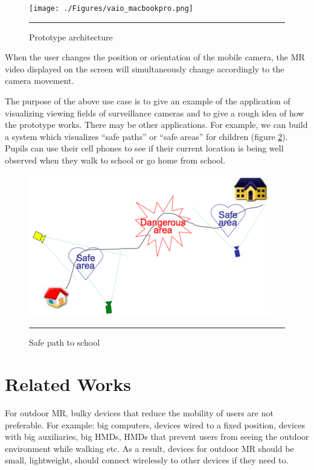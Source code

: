 \begin{figure}[htbp]
	\centering
	\texttt{[image: ./Figures/vaio\_macbookpro.png]}
	\rule{35em}{0.5pt}
	\caption[Prototype architecture]{Prototype architecture}
	\label{fig:VAIOMacBookPro}
\end{figure}

When the user changes the position or orientation of the mobile camera, the MR video displayed on the screen will simultaneously change accordingly to the camera movement.

The purpose of the above use case is to give an example of the application of visualizing viewing fields of surveillance cameras and to give a rough idea of how the prototype works. There may be other applications. For example, we can build a system which visualizes ``safe paths'' or ``safe areas'' for children (figure \ref{fig:HomeSchool}). Pupils can use their cell phones to see if their current location is being well observed when they walk to school or go home from school.

\begin{figure}[htbp]
	\centering
	\includegraphics{./Primitives/home_school.png}
	\rule{35em}{0.5pt}
	\caption[Safe path to school]{Safe path to school}
	\label{fig:HomeSchool}
\end{figure}


\section{Related Works}

For outdoor MR, bulky devices that reduce the mobility of users are not preferable. For example: big computers, devices wired to a fixed position, devices with big auxiliaries, big HMDs, HMDs that prevent users from seeing the outdoor environment while walking etc. As a result, devices for outdoor MR should be small, lightweight, should connect wirelessly to other devices if they need to.

